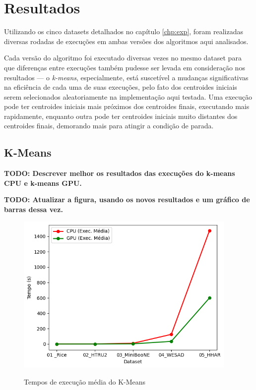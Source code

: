 \documentclass[12pt,
openright, 
oneside, %
a4paper,    %
brazil]{facom-ufu-abntex2}
\begin{document}

\chapter{Resultados}
\label{chp:resultados}

Utilizando os cinco datasets detalhados no capítulo \ref{chp:exp}, foram realizadas diversas rodadas de execuções em ambas versões dos algoritmos aqui analisados.

Cada versão do algoritmo foi executado diversas vezes no mesmo dataset para que diferenças entre execuções também pudesse ser levada em consideração nos resultados — o \textit{k-means}, especialmente, está suscetível a mudanças significativas na eficiência de cada uma de suas execuções, pelo fato dos centroides iniciais serem selecionados aleatoriamente na implementação aqui testada. Uma execução pode ter centroides iniciais mais próximos dos centroides finais, executando mais rapidamente, enquanto outra pode ter centroides iniciais muito distantes dos centroides finais, demorando mais para atingir a condição de parada.




\section{K-Means}
\label{sec:testesDeSpeedup}

\textbf{TODO: Descrever melhor os resultados das execuções do k-means CPU e k-means GPU.}

\textbf{TODO: Atualizar a figura, usando os novos resultados e um gráfico de barras dessa vez.}

\begin{figure}[h]
  \caption{Tempos de execução média do K-Means}
  \centering
  \includegraphics[width=0.95\textwidth]{kMeansResultsAvg.png}
  \label{fig:kMeansAvg}
\end{figure}
\end{document}
